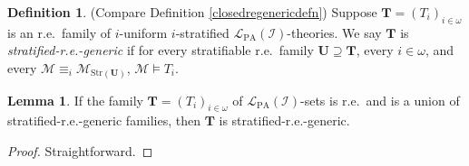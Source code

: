 \documentclass[reqno]{article}
\theoremstyle{definition}
\newtheorem{lemma}[theorem]{Lemma}
\newtheorem{definition}[theorem]{Definition}
\def\L{\mathscr{L}}
\def\M{\mathscr{M}}
\def\T{\mathbf{T}}
\def\U{\mathbf{U}}
\def\LPA{\L_{\mathrm{PA}}}
\def\indset{\mathcal I}
\def\myequiv{\equiv}
\newcommand{\str}[1]{\mathrm{Str}(#1)} \newcommand{\Str}[1]{\str{#1}}
\begin{document}
\begin{definition}
\label{bootstrapclosedrestrat}
(Compare Definition \ref{closedregenericdefn})
Suppose $\T=(T_i)_{i\in\omega}$
is an r.e.~family of $i$-uniform $i$-stratified $\LPA(\indset)$-theories.
%
%
We say $\T$ is \emph{stratified-r.e.-generic} if
for every stratifiable r.e.~family $\U\supseteq\T$, every $i\in\omega$, and every $\M\myequiv_i\M_{\str\U}$, $\M\models T_i$.
\end{definition}

%
%

\begin{lemma}
If the family $\T=(T_i)_{i\in\omega}$ of $\LPA(\indset)$-sets is r.e.~and is a union
of stratified-r.e.-generic families, then $\T$ is stratified-r.e.-generic.
\end{lemma}

\begin{proof}
Straightforward.
\end{proof}
\end{document}
